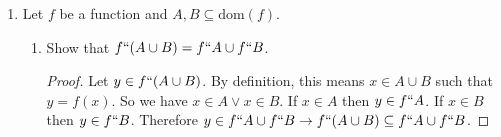 \documentclass[11pt]{amsart}
\DeclareMathOperator{\ran}{ran}
\begin{document}
\begin{enumerate}
\begin{enumerate}
\begin{proof}
 \vspace{1em}
 Case 2: $\{x_1\} = \{x_2, y_2\}$ and $\{x_1, y_1\} = \{x_2\}$.
 From $\{x_1\} = \{x_2, y_2\}$, we have $x_1 = x_2$ and $x_1 = y_2$.
 From $\{x_1, y_1\} = \{x_2\}$, we have $x_1 = x_2$ and $y_1 = x_2$.
 Therefore, $x_1 = x_2$ and $y_1 = x_2 = x_1 = y_2$, so $y_1 = y_2$.

 In either case, we have shown that $x_1 = x_2$ and $y_1 = y_2$.

\end{proof}

\item Show that it would not work to define the ordered pair as $(x,y) = \{ x, \{y\}\}$, i.e., find $x_1,y_1,x_2,y_2$ for which the analogue of the previous part is false.
\vspace{1em}

Let $A = (x_1, y_1)$ and $B = (x_2, y_2)$.
From our new definition $A = \{x_1, \{y_1\}\}$ and $B = \{x_2, \{y_2\}\}$.
Now, let $x_1 = \{a_2\}$, $y_1 = a_1$, $x_2 = a_1$, and $y_2 = \{a_2\}$.
Then $A = \{\{a_2\}, a_1\}$ and $B = \{a_1, \{a_2\}\}$.
Assuming $a_1 \neq \{a_2\}$ then $x_1 \neq x_2$ and $y_1 \neq y_2$
But $A = B$ i.e. $(x_1,y_1) = (x_2,y_2)$ when $x_1 = y_2$ and $y_1 = x_2$.

\vfill
\end{enumerate}

\newpage

\item Let $f$ be a function and $A, B \subseteq \text{dom}(f)$.
\begin{enumerate}
\item Show that $f``(A \cup B) = f``A \cup f``B$.

\begin{proof}

Let $y \in f``(A \cup B)$.
By definition, this means $x \in A \cup B$ such that $y = f(x)$.
So we have $x \in A \vee x \in B$.
If $x \in A$ then $y \in f``A$.
If $x \in B$ then $y \in f``B$.
Therefore $y \in f``A \cup f``B \rightarrow f``(A \cup B) \subseteq f``A \cup f``B$.


\end{proof}
\end{enumerate}
\end{enumerate}
\end{document}
